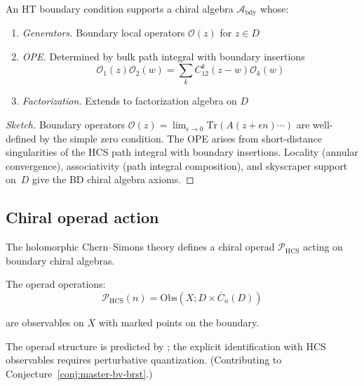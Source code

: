 \begin{theorem}
\label{thm:ht-boundary-chiral-algebra}
\cite{CDG20}
An HT boundary condition supports a chiral algebra $\mathcal{A}_{\text{bdy}}$ whose:
\begin{enumerate}
\item \emph{Generators.} Boundary local operators $\mathcal{O}(z)$ for $z \in D$
\item \emph{OPE.} Determined by bulk path integral with boundary insertions
\[\mathcal{O}_1(z) \mathcal{O}_2(w) = \sum_k C_{12}^k(z-w) \mathcal{O}_k(w)\]
\item \emph{Factorization.} Extends to factorization algebra on $D$
\end{enumerate}
\end{theorem}

\begin{proof}[Sketch]
Boundary operators $\mathcal{O}(z) = \lim_{\epsilon \to 0} \mathrm{Tr}(A(z + \epsilon n) \cdots)$ are well-defined by the simple zero condition.  The OPE arises from short-distance singularities of the HCS path integral with boundary insertions.  Locality (annular convergence), associativity (path integral composition), and skyscraper support on~$D$ give the BD chiral algebra axioms.
\end{proof}

\subsection{Chiral operad action}

\begin{conjecture}
\label{conj:chiral-operad-hcs}
The holomorphic Chern--Simons theory defines a chiral operad $\mathcal{P}_{\text{HCS}}$ 
acting on boundary chiral algebras.

The operad operations:
\[\mathcal{P}_{\text{HCS}}(n) = \text{Obs}(X; D \times \overline{C}_n(D))\]

are observables on $X$ with marked points on the boundary.
\end{conjecture}

\begin{remark}[Scope]
The operad structure is predicted by \cite{CG17}; the explicit identification with HCS observables requires perturbative quantization.
(Contributing to Conjecture~\ref{conj:master-bv-brst}.)
\end{remark}

